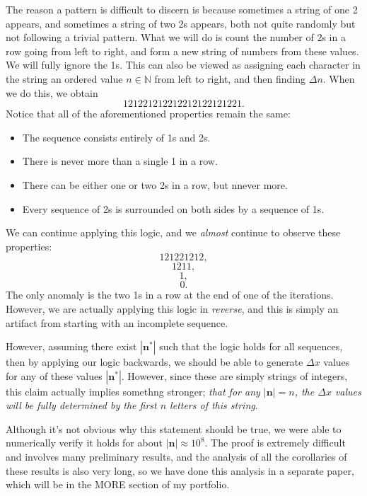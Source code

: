 \documentclass[11pt, letterpaper]{article}
\begin{document}
The reason a pattern is difficult to discern is because sometimes a string of one 2 appears, and sometimes a string of two 2s appears, both not quite randomly but not following a trivial pattern. What we will do is count the number of 2s in a row going from left to right, and form a new string of numbers from these values. We will fully ignore the 1s. This can also be viewed as assigning each character in the string an ordered value $n\in\mathbb{N}$ from left to right, and then finding $\Delta n$. When we do this, we obtain
\[
	121221212212212122121221
.\]
Notice that all of the aforementioned properties remain the same:
\begin{itemize}
	\item The sequence consists entirely of 1s and 2s.
	\item There is never more than a single 1 in a row.
	\item There can be either one or two 2s in a row, but nnever more.
	\item Every sequence of 2s is surrounded on both sides by a sequence of 1s.
\end{itemize}
We can continue applying this logic, and we \emph{almost} continue to observe these properties:
\[
	121221212
,\]
\[
	1211
,\]
\[
	1
,\]
\[
	0
.\]
The only anomaly is the two 1s in a row at the end of one of the iterations. However, we are actually applying this logic in \emph{reverse}, and this is simply an artifact from starting with an incomplete sequence.

However, assuming there exist $\left| \mathbf{n} ^* \right| $ such that the logic holds for all sequences, then by applying our logic backwards, we should be able to generate $\Delta x$ values for any of these values $\left| \mathbf{n} ^* \right| $. However, since these are simply strings of integers, this claim actually implies somethng stronger; \emph{that for any $\left| \mathbf{n}\right|=n $, the $\Delta x$ values will be fully determined by the first $n$ letters of this string}.

Although it's not obvious why this statement should be true, we were able to numerically verify it holds for about $\left| \mathbf{n} \right| \approx 10^8$. The proof is extremely difficult and involves many preliminary results, and the analysis of all the corollaries of these results is also very long, so we have done this analysis in a separate paper, which will be in the MORE section of my portfolio.
\end{document}
